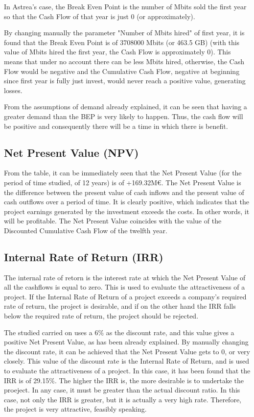 In Astrea's case, the Break Even Point is the number of Mbits sold the first year so that the Cash Flow of that year is just 0 (or approximately). 

By changing manually the parameter "Number of Mbits hired" of first year, it is found that the Break Even Point is of 3708000 Mbits (or 463.5 GB) (with this value of Mbits hired the first year, the Cash Flow is approximately 0). This means that under no account there can be less Mbits hired, otherwise, the Cash Flow would be negative and the Cumulative Cash Flow, negative at beginning since first year is fully just invest, would never reach a positive value, generating losses. 

From the assumptions of demand already explained, it can be seen that having a greater demand than the BEP is very likely to happen. Thus, the cash flow will be positive and consequently there will be a time in which there is benefit.

\subsection{Net Present Value (NPV)}
From the table, it can be immediately seen that the Net Present Value (for the period of time studied, of 12 years) is of +169.32M\euro. The Net Present Value is the difference between the present value of cash inflows and the present value of cash outflows over a period of time. It is clearly positive, which indicates that the project earnings generated by the investment exceeds the costs. In other words, it will be profitable. The Net Present Value coincides with the value of the Discounted Cumulative Cash Flow of the twelfth year. 

\subsection{Internal Rate of Return (IRR)}
The internal rate of retorn is the interest rate at which the Net Present Value of all the cashflows is equal to zero. This is used to evaluate the attractiveness of a project. If the Internal Rate of Return of a project exceeds a company's required rate of return, the project is desirable, and if on the other hand the IRR falls below the required rate of return, the project should be rejected.

The studied carried on uses a 6\% as the discount rate, and this value gives a positive Net Present Value, as has been already explained. By manually changing the discount rate, it can be achieved that the Net Present Value gets to 0, or very closely. This value of the discount rate is the Internal Rate of Return, and is used to evaluate the attractiveness of a project. In this case, it has been found that the IRR is of 29.15\%. The higher the IRR is, the more desirable is to undertake the proeject. In any case, it must be greater than the actual discount ratio. In this case, not only the IRR is greater, but it is actually a very high rate. Therefore, the project is very attractive, feasibly speaking. 

